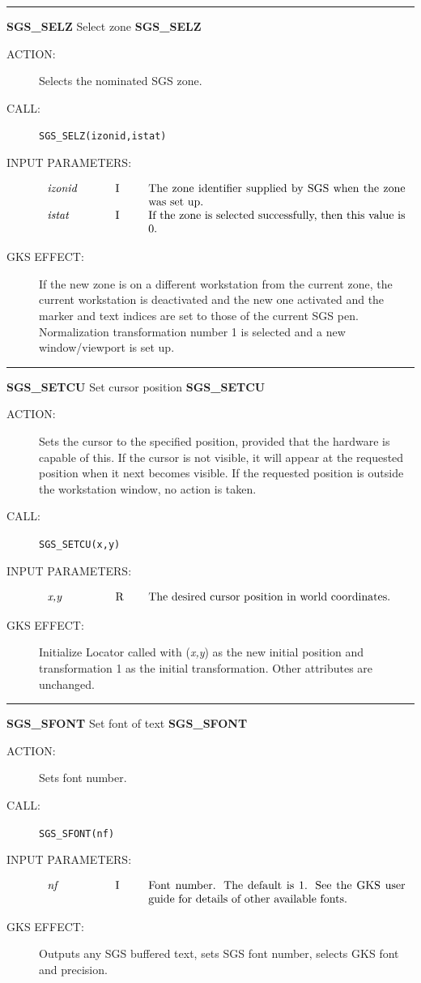 \documentclass[11pt]{article}
\newcommand{\xlabel}[1]{}
\newcommand{\rthead}[2]{\rule{\textwidth}{0.3mm}
{\Large {\bf #1} \hfill #2 \hfill {\bf #1}}}
\newenvironment{params}%
{\[\begin{tabular}{p{0.14\textwidth}p{0.05\textwidth}p{0.66\textwidth}}}%
{\end{tabular}\]}
\newcommand{\rparams}[3]{{\em #1} &#2 &#3\\}
\newcommand{\rthead}[2]{\subsection{\label{#1}\xlabel{#1}#1 - #2}}
\newenvironment{params}{\begin{description}}{\end{description}}
\newcommand{\rparams}[3]{\item{{\em #1}} (#2) #3}
\begin{document}
\rthead{SGS\_SELZ}{Select zone}
\begin{description}
\item [ACTION:]
Selects the nominated SGS zone.
\item [CALL:]
{\tt SGS\_SELZ(izonid,istat)}
\item [INPUT PARAMETERS:]
\begin{params}
\rparams{izonid}{I}{The zone identifier supplied by SGS when the zone was set
up.}
\rparams{istat}{I}{If the zone is selected successfully, then this value is 0.}
\end{params}
\item [GKS EFFECT:]
If the new zone is on a different workstation from the current zone, the current
workstation is deactivated and the new one activated and the marker and text
indices are set to those of the current SGS pen.
Normalization transformation number 1 is selected and a new window/viewport is
set up.
\end{description}
\goodbreak

\rthead{SGS\_SETCU}{Set cursor position}
\begin{description}
\item [ACTION:]
Sets the cursor to the specified position, provided that the hardware is capable
of this.
If the cursor is not visible, it will appear at the requested position when it
next becomes visible.
If the requested position is outside the workstation window, no action is taken.
\item [CALL:]
{\tt SGS\_SETCU(x,y)}
\item [INPUT PARAMETERS:]
\begin{params}
\rparams{x,y}{R}{The desired cursor position in world coordinates.}
\end{params}
\item [GKS EFFECT:]
Initialize Locator called with ({\em x,y}) as the new initial position and
transformation 1 as the initial transformation.
Other attributes are unchanged.
\end{description}
\goodbreak

\rthead{SGS\_SFONT}{Set font of text}
\begin{description}
\item [ACTION:]
Sets font number.
\item [CALL:]
{\tt SGS\_SFONT(nf)}
\item [INPUT PARAMETERS:]
\begin{params}
\rparams{nf}{I}{Font number.
The default is 1.
See the GKS user guide for details of other available fonts.}
\end{params}
\item [GKS EFFECT:]
Outputs any SGS buffered text, sets SGS font number, selects GKS font
and precision.
\end{description}
\goodbreak
\end{document}
